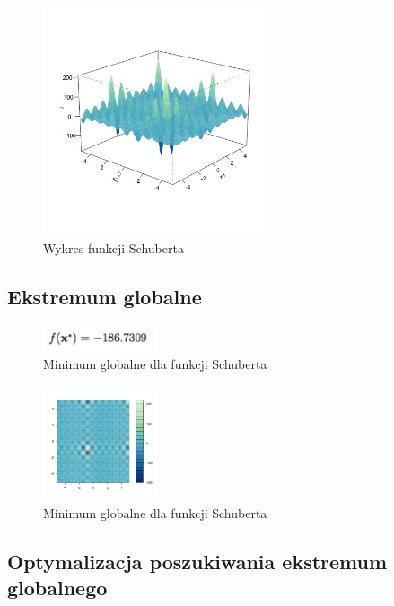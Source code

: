 \documentclass{article}
\begin{document}
    \begin{figure}[!h]
    \centering
    \includegraphics[width=0.6\textwidth]{inc/wykresyfunkcji/schubert}
     \caption{Wykres  funkcji Schuberta}
    \end{figure}
    
    \subsection{Ekstremum globalne}
    
       \begin{figure}[!h]
    \centering
    \includegraphics[width=0.3\textwidth]{inc/wzory/schubert-global-minimum}
     \caption{Minimum globalne dla funkcji Schuberta}
    \end{figure}
    
       \begin{figure}[!h]
    \centering
    \includegraphics[width=0.3\textwidth]{inc/wykresyfunkcji/schubert-global-minimum}
     \caption{Minimum globalne dla funkcji Schuberta}
    \end{figure}
    
    \subsection{Optymalizacja poszukiwania ekstremum globalnego}
\end{document}

